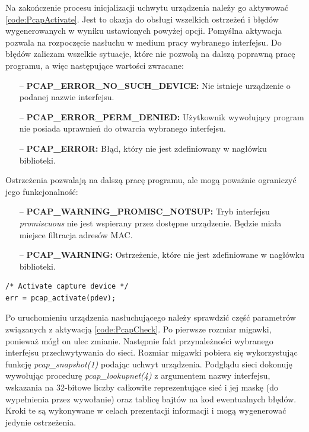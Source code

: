 Na zakończenie procesu inicjalizacji uchwytu urządzenia należy go aktywować \ref{code:PcapActivate}. Jest to okazja do obsługi wszelkich ostrzeżeń i błędów wygenerowanych w wyniku ustawionych powyżej opcji. Pomyślna aktywacja pozwala na rozpoczęcie nasłuchu w medium pracy wybranego interfejsu. Do błędów zaliczam wszelkie sytuacje, które nie pozwolą na dalszą poprawną pracę programu, a więc następujące wartości zwracane:
\begin{itemize}
\item[--] {\bf PCAP\_ERROR\_NO\_SUCH\_DEVICE:} Nie istnieje urządzenie o podanej nazwie interfejsu. 
\item[--] {\bf PCAP\_ERROR\_PERM\_DENIED:} Użytkownik wywołujący program nie posiada uprawnień do otwarcia wybranego interfejsu.
\item[--] {\bf PCAP\_ERROR:} Błąd, który nie jest zdefiniowany w nagłówku biblioteki. 
\end{itemize}
Ostrzeżenia pozwalają na dalszą pracę programu, ale mogą poważnie ograniczyć jego funkcjonalność:
\begin{itemize}
\item[--] {\bf PCAP\_WARNING\_PROMISC\_NOTSUP:} Tryb interfejsu \emph{promiscuous} nie jest wspierany przez dostępne urządzenie. Będzie miała miejsce filtracja adresów MAC.
\item[--] {\bf PCAP\_WARNING:} Ostrzeżenie, które nie jest zdefiniowane w nagłówku biblioteki.
\end{itemize}

\begin{lstlisting}[frame=tb]
/* Activate capture device */                                        
err = pcap_activate(pdev);
\end{lstlisting}

Po uruchomieniu urządzenia nasłuchującego należy sprawdzić część parametrów związanych z aktywacją \ref{code:PcapCheck}. Po pierwsze rozmiar migawki, ponieważ mógł on ulec zmianie. Następnie fakt przynależności wybranego interfejsu przechwytywania do sieci. Rozmiar migawki pobiera się wykorzystując funkcję \emph{pcap\_snapshot(1)} podając uchwyt urządzenia. Podglądu sieci dokonuję wywołując procedurę \emph{pcap\_lookupnet(4)} z argumentem nazwy interfejsu, wskazania na 32-bitowe liczby całkowite reprezentujące sieć i jej maskę (do wypełnienia przez wywołanie) oraz tablicę bajtów na kod ewentualnych błędów. Kroki te są wykonywane w celach prezentacji informacji i mogą wygenerować jedynie ostrzeżenia.

